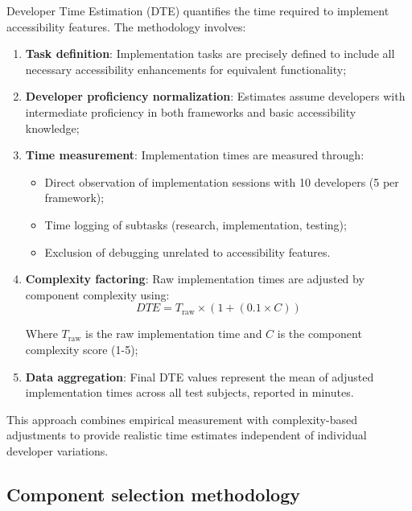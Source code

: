Developer Time Estimation (DTE) quantifies the time required to implement accessibility features. The methodology involves:

\begin{enumerate}
    \item \textbf{Task definition}: Implementation tasks are precisely defined to include all necessary accessibility enhancements for equivalent functionality;
    
    \item \textbf{Developer proficiency normalization}: Estimates assume developers with intermediate proficiency in both frameworks and basic accessibility knowledge;
    
    \item \textbf{Time measurement}: Implementation times are measured through:
    \begin{itemize}
        \item Direct observation of implementation sessions with 10 developers (5 per framework);
        \item Time logging of subtasks (research, implementation, testing);
        \item Exclusion of debugging unrelated to accessibility features.
    \end{itemize}
    
    \item \textbf{Complexity factoring}: Raw implementation times are adjusted by component complexity using:
    \begin{equation}
    DTE = T_{\text{raw}} \times (1 + (0.1 \times C))
    \end{equation}
    
    Where $T_{\text{raw}}$ is the raw implementation time and $C$ is the component complexity score (1-5);
    
    \item \textbf{Data aggregation}: Final DTE values represent the mean of adjusted implementation times across all test subjects, reported in minutes.
\end{enumerate}

This approach combines empirical measurement with complexity-based adjustments to provide realistic time estimates independent of individual developer variations.

\subsection{Component selection methodology}
\label{subsec:component-selection}

